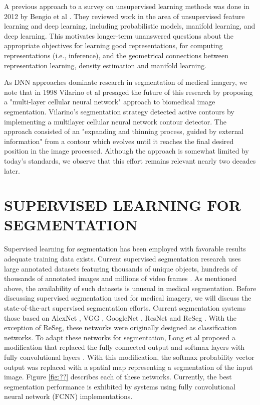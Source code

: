 \documentclass[letterpaper, 10 pt, conference]{ieeeconf}  %
\begin{document}
A previous approach to a survey on unsupervised learning methods was done in 2012 by Bengio et al \cite{bengio_representation_2012}. They reviewed work in the area of unsupervised feature learning and deep learning, including probabilistic models, manifold learning, and deep learning. This motivates longer-term unanswered questions about the appropriate objectives for learning good representations, for computing representations (i.e., inference), and the geometrical connections between representation learning, density estimation and manifold learning.

As DNN approaches dominate research in segmentation of medical imagery, we note that in 1998 Vilarino et al \cite{vilarino_discrete-time_1998} presaged the future of this research by proposing a "multi-layer cellular neural network"  approach to biomedical image segmentation. Vilarino's segmentation strategy detected active contours by implementing a multilayer cellular neural network contour detector. The approach consisted of an "expanding and thinning process, guided by external information" from a contour which evolves until it reaches the final desired position in the image processed. Although the approach is somewhat limited by today's standards, we observe that this effort remains relevant nearly two decades later.

\section{SUPERVISED LEARNING FOR SEGMENTATION}

Supervised learning for segmentation has been employed with favorable results adequate training data exists. Current supervised segmentation research uses large annotated datasets featuring thousands of unique objects, hundreds of thousands of annotated images and millions of video frames \cite{xu2018youtube}. As mentioned above, the availability of such datasets is unusual in medical segmentation. Before discussing supervised segmentation used for medical imagery, we will discuss the state-of-the-art supervised segmentation efforts. Current segmentation systems those based on AlexNet \cite{krizhevsky_imagenet_2012}, VGG \cite{simonyan_very_deep}, GoogleNet \cite{szegedy_deeper}, ResNet \cite{he_deep_residual} and ReSeg \cite{Visin_2016_CVPR_Workshops}. With the exception of ReSeg, these networks were originally designed as classification networks. To adapt these networks for segmentation, Long et al proposed a modification that replaced the fully connected output and softmax layers with fully convolutional layers \cite{long_fully_2015}. With this modification, the softmax probability vector output was replaced with a spatial map representing a segmentation of the input image. Figure \ref{fig:??} describes each of these networks. Currently, the best segmentation performance is exhibited by systems using fully convolutional neural network (FCNN) implementations.
\end{document}
